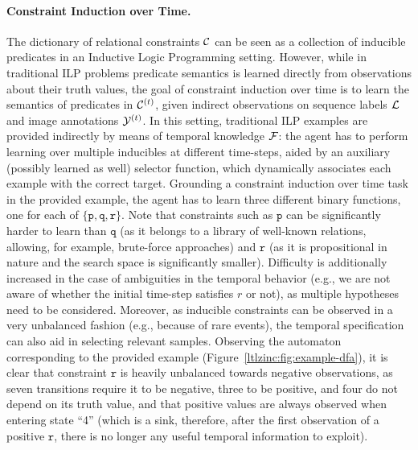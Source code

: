 \paragraph{Constraint Induction over Time.}
The dictionary of relational constraints ${\mathcal{C}}$ can be seen as a collection of inducible predicates in an Inductive Logic Programming setting. However, while in traditional ILP problems predicate semantics is learned directly from observations about their truth values, the goal of constraint induction over time is to learn the semantics of predicates in ${\mathcal{C}}^{(t)}$, given indirect observations on sequence labels ${\mathcal{L}}$ and image annotations ${\mathcal{Y}}^{(t)}$. In this setting, traditional ILP examples are provided indirectly by means of temporal knowledge ${\mathcal{F}}$: the agent has to perform learning over multiple inducibles at different time-steps, aided by an auxiliary (possibly learned as well) selector function, which dynamically associates each example with the correct target.
Grounding a constraint induction over time task in the provided example, the agent has to learn three different binary functions, one for each of $\{\texttt{p}, \texttt{q}, \texttt{r}\}$. Note that constraints such as $\texttt{p}$ can be significantly harder to learn than $\texttt{q}$ (as it belongs to a library of well-known relations, allowing, for example, brute-force approaches) and $\texttt{r}$ (as it is propositional in nature and the search space is significantly smaller). Difficulty is additionally increased in the case of ambiguities in the temporal behavior (e.g., we are not aware of whether the initial time-step satisfies $r$ or not), as multiple hypotheses need to be considered.
Moreover, as inducible constraints can be observed in a very unbalanced fashion (e.g., because of rare events), the temporal specification can also aid in selecting relevant samples. Observing the automaton corresponding to the provided example (Figure~\ref{ltlzinc:fig:example-dfa}), it is clear that constraint $\texttt{r}$ is heavily unbalanced towards negative observations, as seven transitions require it to be negative, three to be positive, and four do not depend on its truth value, and that positive values are always observed when entering state ``4'' (which is a sink, therefore, after the first observation of a positive $\texttt{r}$, there is no longer any useful temporal information to exploit).


